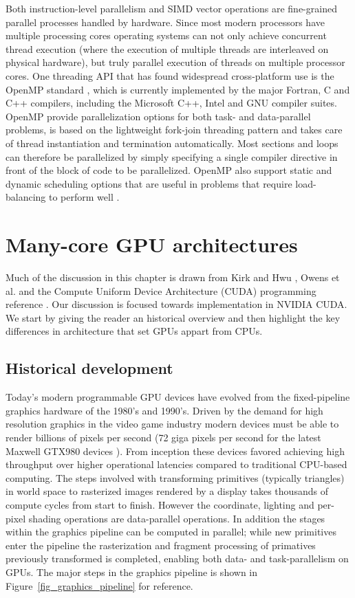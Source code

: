 Both instruction-level parallelism and SIMD vector operations are fine-grained parallel processes handled by hardware. Since most modern processors have multiple processing cores operating systems can not only achieve concurrent thread execution 
(where the execution of multiple threads are interleaved on physical hardware), but truly parallel execution of threads on multiple processor cores. One threading API that has found widespread cross-platform use is the OpenMP standard \cite{openmp}, which is currently
implemented by the major Fortran, C and C++ compilers, including the Microsoft C++, Intel and GNU compiler suites. OpenMP provide parallelization options for both task- and data-parallel problems, is based on the lightweight fork-join threading pattern and
takes care of thread instantiation and termination automatically. Most sections and loops can therefore be parallelized by simply specifying a single compiler directive in front of the block of code to be parallelized. OpenMP also support static and dynamic
scheduling options that are useful in problems that require load-balancing to perform well \cite{openmp,akhter2006multi}.
\section{Many-core GPU architectures}
Much of the discussion in this chapter is drawn from Kirk and Hwu \cite[ch. 1-3]{kirk2012programming}, Owens et al. \cite{owens2008gpu} and the Compute Uniform Device Architecture (CUDA)
programming reference \cite{cuda}. Our discussion is focused towards implementation in NVIDIA CUDA. We start by giving the reader an historical overview and then highlight the key differences
in architecture that set GPUs appart from CPUs.
\subsection{Historical development}
Today's modern programmable GPU devices have evolved from the fixed-pipeline graphics hardware of the 1980's and 1990's. Driven by the demand
for high resolution graphics in the video game industry modern devices must be able to render billions of pixels per second (72 giga pixels per second 
for the latest Maxwell GTX980 devices \cite{gtx980}). From inception these devices favored achieving high throughput over higher operational latencies compared to traditional
CPU-based computing. The steps involved with transforming primitives (typically triangles) in world space to rasterized images rendered by a display takes thousands
of compute cycles from start to finish. However the coordinate, lighting and per-pixel shading operations are data-parallel operations. In addition the stages within
the graphics pipeline can be computed in parallel; while new primitives enter the pipeline the rasterization and fragment processing of primatives previously transformed is 
completed, enabling both data- and task-parallelism on GPUs. The major steps in the graphics pipeline is shown in Figure~\ref{fig_graphics_pipeline} for reference.

